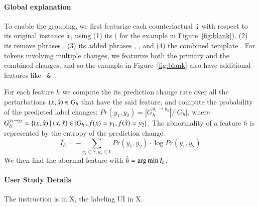 \paragraph{Global explanation}
To enable the grouping, we first featurize each counterfactual $\hat{x}$ with respect to its original instance $x$, using 
(1) its \tagstr ( for the example in Figure~\ref{fig:blank}), 
(2) its remove phrases , 
(3) its added phrases , , and 
(4) the combined template .
For tokens involving multiple changes, we featurize both the primary and the combined changes, and so the example in Figure~\ref{fig:blank} also have additional features like \texttt{ \& }.

For each feature $h$ we compute the its prediction change rate over all the perturbations $(x, \hat{x}) \in G_{h}$ that have the said feature, and compute the probability of the predicted label changes: $Pr(y_1, y_2) = |G_h^{y_1\rightarrow y_2}|/|G_h|$, where $ G_h^{y_1\rightarrow y_2} = \{ (x, \xp)\ |\ (x, \xp) \in |G_h|, f(x)=y_1, f(\xp) = y_2 \}$.
The abnormality of a feature $h$ is represented by the entropy of the prediction change:
$$I_h = -\sum_{y_1 \in Y, y_2 \in Y} Pr(y_1, y_2) \cdot \log Pr(y_1, y_2)$$
We then find the abormal feature with $\hat{h} = \operatorname*{arg\,min} I_h$.



\paragraph{User Study Details}

The instruction is in X, the labeling UI in X.